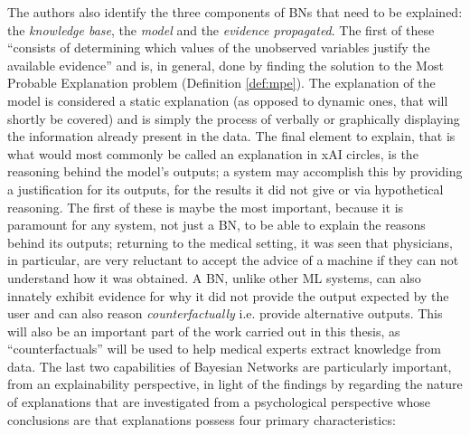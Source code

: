 The authors also identify the three components of BNs that need to be explained: the \textit{knowledge base}, the \textit{model} and the \textit{evidence propagated}.
The first of these \enquote{consists of determining which values of the unobserved variables justify the available evidence} and is, in general, done by finding the solution to the Most Probable Explanation problem (Definition \ref{def:mpe}).
The explanation of the model is considered a static explanation (as opposed to dynamic ones, that will shortly be covered) and is simply the process of verbally or graphically displaying the information already present in the data.
The final element to explain, that is what would most commonly be called an explanation in xAI circles, is the reasoning behind the model's outputs; a system may accomplish this by providing a justification for its outputs, for the results it did not give or via hypothetical reasoning.
The first of these is maybe the most important, because it is paramount for any system, not just a BN, to be able to explain the reasons behind its outputs; returning to the medical setting, it was seen that physicians, in particular, are very reluctant to accept the advice of a machine if they can not understand how it was obtained.
A BN, unlike other ML systems, can also innately exhibit evidence for why it did not provide the output expected by the user and can also reason \textit{counterfactually} i.e. provide alternative outputs.
This will also be an important part of the work carried out in this thesis, as \enquote{counterfactuals} will be used to help medical experts extract knowledge from data. 
The last two capabilities of Bayesian Networks are particularly important, from an explainability perspective, in light of the findings by \citet{miller2018explanation} regarding the nature of explanations that are investigated from a psychological perspective whose conclusions are that explanations possess four primary characteristics:
